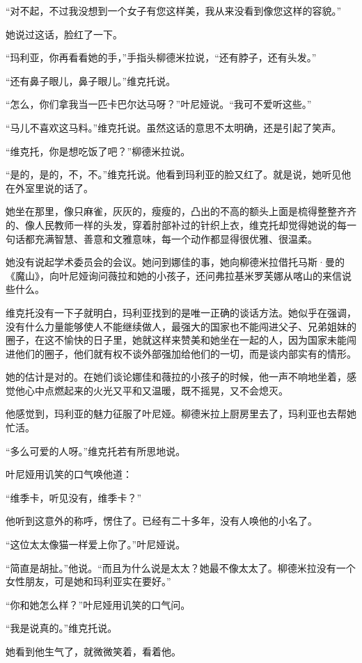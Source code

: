 “对不起，不过我没想到一个女子有您这样美，我从来没看到像您这样的容貌。”

她说过这话，脸红了一下。

“玛利亚，你再看看她的手，”手指头柳德米拉说，“还有脖子，还有头发。”

“还有鼻子眼儿，鼻子眼儿。”维克托说。

“怎么，你们拿我当一匹卡巴尔达马呀？”叶尼娅说。“我可不爱听这些。”

“马儿不喜欢这马料。”维克托说。虽然这话的意思不太明确，还是引起了笑声。

“维克托，你是想吃饭了吧？”柳德米拉说。

“是的，是的，不，不。”维克托说。他看到玛利亚的脸又红了。就是说，她听见他在外室里说的话了。

她坐在那里，像只麻雀，灰灰的，瘦瘦的，凸出的不高的额头上面是梳得整整齐齐的、像人民教师一样的头发，穿着肘部补过的针织上衣，维克托却觉得她说的每一句话都充满智慧、善意和文雅意味，每一个动作都显得很优雅、很温柔。

她没有说起学术委员会的会议。她问到娜佳的事，她向柳德米拉借托马斯·曼的《魔山》，向叶尼娅询问薇拉和她的小孩子，还问弗拉基米罗芙娜从喀山的来信说些什么。

维克托没有一下子就明白，玛利亚找到的是唯一正确的谈话方法。她似乎在强调，没有什么力量能够使人不能继续做人，最强大的国家也不能闯进父子、兄弟姐妹的圈子，在这不愉快的日子里，她就这样来赞美和她坐在一起的人，因为国家未能闯进他们的圈子，他们就有权不谈外部强加给他们的一切，而是谈内部实有的情形。

她的估计是对的。在她们谈论娜佳和薇拉的小孩子的时候，他一声不响地坐着，感觉他心中点燃起来的火光又平和又温暖，既不摇晃，又不会熄灭。

他感觉到，玛利亚的魅力征服了叶尼娅。柳德米拉上厨房里去了，玛利亚也去帮她忙活。

“多么可爱的人呀。”维克托若有所思地说。

叶尼娅用讥笑的口气唤他道：

“维季卡，听见没有，维季卡？”

他听到这意外的称呼，愣住了。已经有二十多年，没有人唤他的小名了。

“这位太太像猫一样爱上你了。”叶尼娅说。

“简直是胡扯。”他说。“而且为什么说是太太？她最不像太太了。柳德米拉没有一个女性朋友，可是她和玛利亚实在要好。”

“你和她怎么样？”叶尼娅用讥笑的口气问。

“我是说真的。”维克托说。

她看到他生气了，就微微笑着，看着他。

